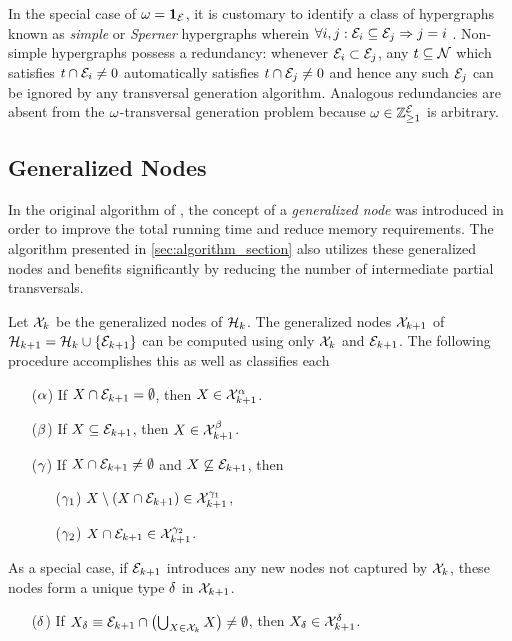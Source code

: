 \documentclass[aps, 10pt, english, twoside, twocolumn, pra, nofootinbib, tightenlines, longbibliography, superscriptaddress]{revtex4-1}
\begin{document}
    In the special case of $\omega = \mathbf{1}_{\mathcal{E}}$, it is customary to identify a class of hypergraphs known as \textit{simple} or \textit{Sperner} hypergraphs wherein $\forall i, j : \mathcal{E}_i \subseteq \mathcal{E}_j \Rightarrow j = i$ \cite{Berge_1984}. Non-simple hypergraphs possess a redundancy: whenever $\mathcal{E}_i \subset \mathcal{E}_j$, any $t \subseteq \mathcal{N}$ which satisfies $t \cap \mathcal{E}_i \neq 0$ automatically satisfies $t \cap \mathcal{E}_j \neq 0$ and hence any such $\mathcal{E}_j$ can be ignored by any transversal generation algorithm. Analogous redundancies are absent from the $\omega$-transversal generation problem because $\omega \in {\mathbb{Z}}_{\geq 1}^{\mathcal{E}}$ is arbitrary.

    \subsection{Generalized Nodes}

    In the original algorithm of \citet{Kavvadias_2005}, the concept of a \textit{generalized node} was introduced in order to improve the total running time and reduce memory requirements. The algorithm presented in \cref{sec:algorithm_section} also utilizes these generalized nodes and benefits significantly by reducing the number of intermediate partial transversals.

    Let $\mathcal{X}_{k}$ be the generalized nodes of $\mathcal{H}_{k}$. The generalized nodes $\mathcal{X}_{k+1}$ of $\s H_{k+1} = \s H_{k} \cup \bc{\edges_{k+1}}$ can be computed using only $\mathcal{X}_{k}$ and $\mathcal{E}_{k+1}$. The following procedure accomplishes this as well as classifies each
    \begin{itemize}
        \item[($\alpha$)] If $X \cap \mathcal{E}_{k+1} = \emptyset$, then $X \in \mathcal{X}^{\alpha}_{k+1}$.
        \item[($\beta$)] If $X \subseteq \mathcal{E}_{k+1}$, then $X \in \mathcal{X}^{\beta}_{k+1}$.
        \item[($\gamma$)] If $X \cap \mathcal{E}_{k+1} \neq \emptyset$ and $X \not \subseteq \mathcal{E}_{k+1}$, then
        \begin{itemize}
            \item[($\gamma_1$)] $X \setminus \br{X \cap \edges_{k+1}} \in \s X^{\ga_1}_{k+1}$,
            \item[($\gamma_2$)] $X \cap \mathcal{E}_{k+1} \in \mathcal{X}^{\gamma_2}_{k+1}$.
        \end{itemize}
    \end{itemize}
    As a special case, if $\mathcal{E}_{k+1}$ introduces any new nodes not captured by $\mathcal{X}_{k}$, these nodes form a unique type $\delta$ in $\mathcal{X}_{k+1}$.
    \begin{itemize}
        \item[($\delta$)] If $X_{\de} \defined \edges_{k+1} \cap \br{\bigcup_{X \in \s X_{k}} X} \neq \emptyset$, then $X_{\delta} \in \mathcal{X}_{k+1}^{\delta}$.
    \end{itemize}
\end{document}
